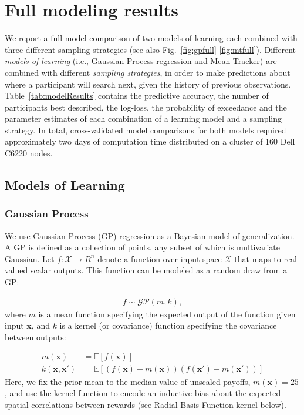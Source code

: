 
\section*{Full modeling results}
We report a full model comparison of two models of learning each combined with three different sampling strategies (see also Fig.~\ref{fig:gpfull}-\ref{fig:mtfull}). Different \emph{models of learning} (i.e., Gaussian Process regression and Mean Tracker) are combined with different \emph{sampling strategies}, in order to make predictions about where a participant will search next, given the history of previous observations. Table~\ref{tab:modelResults} contains the predictive accuracy, the number of participants best described, the log-loss, the probability of exceedance and the parameter estimates of each combination of a learning model and a sampling strategy. In total, cross-validated model comparisons for both models required approximately two days of computation time distributed on a cluster of 160 Dell C6220 nodes. 

\subsection*{Models of Learning} 
\subsubsection{Gaussian Process} 

We use Gaussian Process (GP) regression as a Bayesian model of generalization. A GP is defined as a collection of points, any subset of which is multivariate Gaussian. Let $f: \mathcal{X} \rightarrow R^n$ denote a function over input space $\mathcal{X}$ that maps to real-valued scalar outputs. This function can be modeled as a random draw from a GP:

\begin{align}
f \sim \mathcal{GP}(m,k),
\end{align}
where $m$ is a mean function specifying the expected output of the function given input $\mathbf{x}$, and $k$ is a kernel (or covariance) function specifying the covariance between outputs:

\begin{align}
m(\mathbf{x})&=\mathbb{E}[f( \mathbf{x})]\\
k(\mathbf{x}, \mathbf{x}')&=\mathbb{E}\left[(f( \mathbf{x})-m(\mathbf{x}))(f( \mathbf{x'})-m(\mathbf{x'}))\right]
\end{align} 
Here, we fix the prior mean to the median value of unscaled payoffs, $m(\mathbf{x})=25$, and use the kernel function to encode an inductive bias about the expected spatial correlations between rewards (see Radial Basis Function kernel below). 

